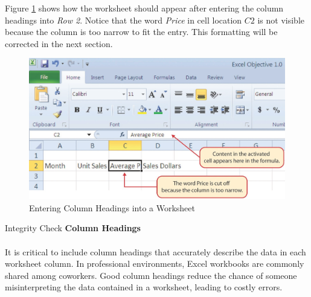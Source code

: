 Figure \ref{01:fig15} shows how the worksheet should appear after entering the column headings into \textit{Row 2}. Notice that the word \textit{Price} in cell location $ C2 $ is not visible because the column is too narrow to fit the entry. This formatting will be corrected in the next section.

\begin{figure}[H]
	\centering
	\includegraphics[width=\maxwidth{.95\linewidth}]{gfx/ch01_fig15}
	\caption{Entering Column Headings into a Worksheet}
	\label{01:fig15}
\end{figure}

\begin{center}
	\begin{infobox}{Integrity Check}
		\textbf{Column Headings}
		\\
		\\
		It is critical to include column headings that accurately describe the data in each worksheet column. In professional environments, Excel workbooks are commonly shared among coworkers. Good column headings reduce the chance of someone misinterpreting the data contained in a worksheet, leading to costly errors.
	\end{infobox}
\end{center}

